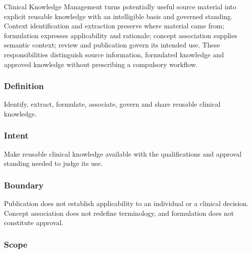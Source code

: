 Clinical Knowledge Management turns potentially useful source material into explicit reusable knowledge with an intelligible basis and governed standing. Context identification and extraction preserve where material came from; formulation expresses applicability and rationale; concept association supplies semantic context; review and publication govern its intended use. These responsibilities distinguish source information, formulated knowledge and approved knowledge without prescribing a compulsory workflow.

\subsubsection*{Definition}

Identify, extract, formulate, associate, govern and share reusable clinical knowledge.

\subsubsection*{Intent}

Make reusable clinical knowledge available with the qualifications and approval standing needed to judge its use.

\subsubsection*{Boundary}

Publication does not establish applicability to an individual or a clinical decision. Concept association does not redefine terminology, and formulation does not constitute approval.

\subsubsection*{Scope}
